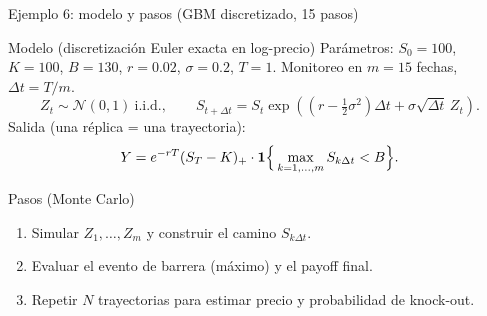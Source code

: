 \documentclass[aspectratio=1610, 9pt]{beamer}
\begin{document}
\begin{frame}{Ejemplo 6: modelo y pasos (GBM discretizado, 15 pasos)}
\small
\begin{block}{Modelo (discretización Euler exacta en log-precio)}
Parámetros: $S_0=100$, $K=100$, $B=130$, $r=0.02$, $\sigma=0.2$, $T=1$.
Monitoreo en $m=15$ fechas, $\Delta t=T/m$.
\[
Z_t\sim\mathcal{N}(0,1)\ \text{i.i.d.},\qquad
S_{t+\Delta t}=S_t\exp\!\left((r-\tfrac12\sigma^2)\Delta t + \sigma\sqrt{\Delta t}\,Z_t\right).
\]
Salida (una réplica = una trayectoria):
\[
Y=e^{-rT}(S_T-K)_+\cdot \mathbf{1}\Big\{\max_{k=1,\dots,m} S_{k\Delta t}<B\Big\}.
\]
\end{block}

\begin{block}{Pasos (Monte Carlo)}
\begin{enumerate}
\item Simular $Z_1,\dots,Z_m$ y construir el camino $S_{k\Delta t}$.
\item Evaluar el evento de barrera (máximo) y el payoff final.
\item Repetir $N$ trayectorias para estimar precio y probabilidad de knock-out.
\end{enumerate}
\end{block}
\end{frame}
\end{document}
